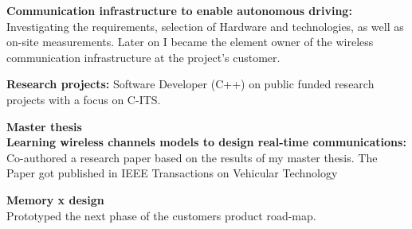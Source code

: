 \documentclass[a4paper,12pt,final]{memoir}
\newcommand{\SmallSep}{\vspace{0.5em}}
\newcommand{\CVItem}[1]
	{\textbf{\color{NavyBlue} #1}}
\begin{document}
\textbf{Communication infrastructure to enable autonomous driving:} Investigating the requirements, selection of Hardware and technologies, as well as on-site measurements. Later on I became the element owner of the wireless communication infrastructure at the project's customer.  
\SmallSep

\textbf{Research projects:} Software Developer (C++) on public funded research projects with a focus on C-ITS. \\
\SmallSep

\CVItem{Master thesis} \\
\textbf{Learning wireless channels models to design real-time communications:} Co-authored a research paper based on the results of my master thesis. The Paper got published in IEEE Transactions on Vehicular Technology \\
\SmallSep

\CVItem{Memory x design} \\
Prototyped the next phase of the customers product road-map.


\end{document}
